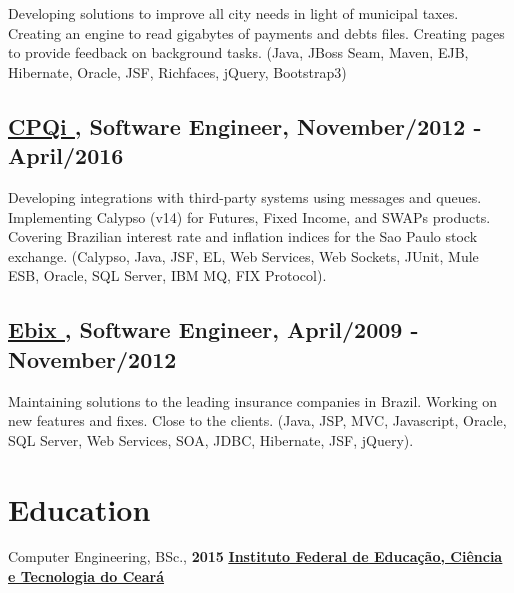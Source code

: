 \documentclass[10pt,a4paper]{article}
\begin{document}
Developing solutions to improve all city needs in light of municipal taxes. Creating an engine to read gigabytes of payments and debts files. Creating pages to provide feedback on background tasks. (Java, JBoss Seam, Maven, EJB, Hibernate, Oracle, JSF, Richfaces, jQuery, Bootstrap3)

\subsection*{\href{https://cpqi.com/}{\uline{CPQi \faExternalLink}}, Software Engineer, November/2012 - April/2016}

Developing integrations with third-party systems using messages and queues. Implementing Calypso (v14) for Futures, Fixed Income, and SWAPs products. Covering Brazilian interest rate and inflation indices for the Sao Paulo stock exchange. (Calypso, Java, JSF, EL, Web Services, Web Sockets, JUnit, Mule ESB, Oracle, SQL Server, IBM MQ, FIX Protocol).

\subsection*{\href{https://www.ebix.com/}{\uline{Ebix \faExternalLink}}, Software Engineer, April/2009 - November/2012}

Maintaining solutions to the leading insurance companies in Brazil. Working on new features and fixes. Close to the clients. (Java, JSP, MVC, Javascript, Oracle, SQL Server, Web Services, SOA, JDBC, Hibernate, JSF, jQuery).

\section*{Education}
Computer Engineering, BSc., \textbf{2015}
\bfseries \small
\href{https://ifce.edu.br/}{\uline{Instituto Federal de Educação, Ciência e Tecnologia do Ceará \faExternalLink}}

\vspace{1.6em}
\end{document}
